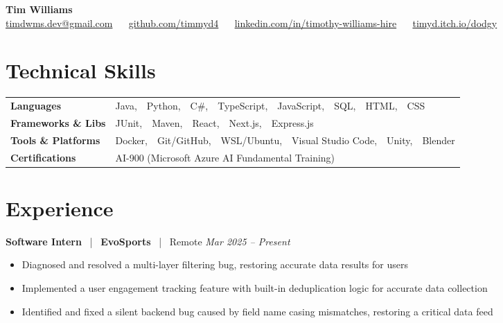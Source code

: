 \documentclass[10pt, letterpaper]{article}
\newcommand{\jobhead}[4]{%
  \vspace{5pt}%
  {\bfseries\color{dark}#1}%
  ~{\color{light}|}~%
  {\bfseries\color{navy}#2}%
  ~{\color{light}|}~%
  {\color{light}#3}%
  \hfill{\color{light}\small\textit{#4}}\\[-2pt]%
}
\newcommand{\skillrow}[2]{%
  {\bfseries #1} & #2 \\[2pt]%
}
\begin{document}

\begin{center}
  {\huge\bfseries\color{navy} Tim Williams}\\[4pt]
  {\small\color{light}
    \href{mailto:timdwms.dev@gmail.com}{timdwms.dev@gmail.com}
    ~\textbullet~
    \href{https://github.com/timmyd4}{github.com/timmyd4}
    ~\textbullet~
    \href{https://www.linkedin.com/in/timothy-williams-hire}{linkedin.com/in/timothy-williams-hire}
    ~\textbullet~
    \href{https://timyd.itch.io/dodgy}{timyd.itch.io/dodgy}
  }
\end{center}

\vspace{2pt}

\section{Technical Skills}

\begin{tabular}{@{}p{1.6in} p{5.2in}@{}}
  \skillrow{Languages}{Java,\ \ Python,\ \ C\#,\ \ TypeScript,\ \ JavaScript,\ \ SQL,\ \ HTML,\ \ CSS}
  \skillrow{Frameworks \& Libs}{JUnit,\ \ Maven,\ \ React,\ \ Next.js,\ \ Express.js}
  \skillrow{Tools \& Platforms}{Docker,\ \ Git/GitHub,\ \ WSL/Ubuntu,\ \ Visual Studio Code,\ \ Unity,\ \ Blender}
  \skillrow{Certifications}{AI-900 (Microsoft Azure AI Fundamental Training)}
\end{tabular}

\section{Experience}

\jobhead{Software Intern}{EvoSports}{Remote}{Mar 2025 – Present}
\begin{itemize}
  \item Diagnosed and resolved a multi-layer filtering bug, restoring accurate data results for users
  \item Implemented a user engagement tracking feature with built-in deduplication logic for accurate data collection
  \item Identified and fixed a silent backend bug caused by field name casing mismatches, restoring a critical data feed
\end{itemize}
\end{document}
